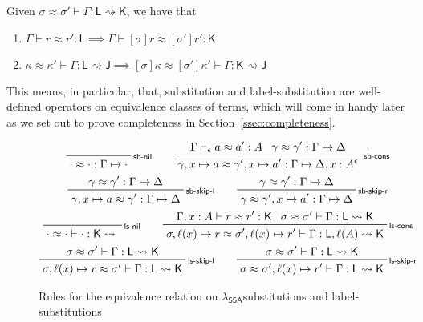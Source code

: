 \documentclass[acmsmall,screen,review]{acmart}
\newcommand{\ms}[1]{\ensuremath{\mathsf{#1}}}
\newcommand{\thyp}[3]{#1 : {#2}^{#3}}
\newcommand{\bhyp}[2]{#1 : #2}
\newcommand{\rle}[1]{{\scriptsize\textsf{#1}}}
\newcommand{\issubst}[3]{#1: #2 \mapsto #3}
\newcommand{\lbsubst}[4]{#1 \vdash #2: #3 \rightsquigarrow #4}
\newcommand{\teqv}{\approx}
\newcommand{\tmeq}[5]{#1 \vdash_{#2} #3 \teqv #4 : {#5}}
\newcommand{\lbeq}[4]{#1 \vdash #2 \teqv #3 : {#4}}
\newcommand{\tmseq}[4]{\issubst{#1 \teqv #2}{#3}{#4}}
\newcommand{\lbseq}[5]{\lbsubst{#1 \teqv #2}{#3}{#4}{#5}}
\newcommand{\isotopessa}{\(\lambda_{\ms{SSA}}\)}
\begin{document}
\begin{lemma}
  Given $\lbseq{\sigma}{\sigma'}{\Gamma}{\ms{L}}{\ms{K}}$, we have that
  \begin{enumerate}[label=(\alph*)]
    \item $\lbeq{\Gamma}{r}{r'}{\ms{L}} \implies \lbeq{\Gamma}{[\sigma]r}{[\sigma']r'}{\ms{K}}$
    \item $\lbseq{\kappa}{\kappa'}{\Gamma}{\ms{L}}{\ms{J}}
      \implies \lbseq{[\sigma]\kappa}{[\sigma']\kappa'}{\Gamma}{\ms{K}}{\ms{J}}$
  \end{enumerate}
\end{lemma}
This means, in particular, that, substitution and label-substitution are well-defined operators on
equivalence classes of terms, which will come in handy later as we set out to prove completeness
in Section~\ref{ssec:completeness}.

\begin{figure}
  \begin{gather*}
    \prftree[r]{\rle{sb-nil}}{\tmseq{\cdot}{\cdot}{\Gamma}{\cdot}} \qquad
    \prftree[r]{\rle{sb-cons}}
      {\tmeq{\Gamma}{\epsilon}{a}{a'}{A}}{\tmseq{\gamma}{\gamma'}{\Gamma}{\Delta}}
      {\tmseq{\gamma, x \mapsto a}{\gamma', x \mapsto a'}{\Gamma}{\Delta, \thyp{x}{A}{\epsilon}}}
    \\
    \prftree[r]{\rle{sb-skip-l}}
      {\tmseq{\gamma}{\gamma'}{\Gamma}{\Delta}}
      {\tmseq{\gamma, x \mapsto a}{\gamma'}{\Gamma}{\Delta}} \qquad
    \prftree[r]{\rle{sb-skip-r}}
      {\tmseq{\gamma}{\gamma'}{\Gamma}{\Delta}}
      {\tmseq{\gamma}{\gamma', x \mapsto a'}{\Gamma}{\Delta}}
    \\
    \prftree[r]{\rle{ls-nil}}{\lbseq{\cdot}{\cdot}{\cdot}{\ms{K}}} \qquad
    \prftree[r]{\rle{ls-cons}}
      {\lbeq{\Gamma, \bhyp{x}{A}}{r}{r'}{\ms{K}}}
      {\lbseq{\sigma}{\sigma'}{\Gamma}{\ms{L}}{\ms{K}}}
      {\lbseq
        {\sigma, \ell(x) \mapsto r}{\sigma', \ell(x) \mapsto r'}{\Gamma}
        {\ms{L}, \ell(A)}{\ms{K}}}
    \\
    \prftree[r]{\rle{ls-skip-l}}
      {\lbseq{\sigma}{\sigma'}{\Gamma}{\ms{L}}{\ms{K}}}
      {\lbseq{\sigma, \ell(x) \mapsto r}{\sigma'}{\Gamma}{\ms{L}}{\ms{K}}}
      \qquad
    \prftree[r]{\rle{ls-skip-r}}
      {\lbseq{\sigma}{\sigma'}{\Gamma}{\ms{L}}{\ms{K}}}
      {\lbseq{\sigma}{\sigma', \ell(x) \mapsto r'}{\Gamma}{\ms{L}}{\ms{K}}}
  \end{gather*}
  \Description{}
  \caption{Rules for the equivalence relation on \isotopessa substitutions and label-substitutions}
  \label{fig:ssa-subst-equiv}
\end{figure}
\end{document}
